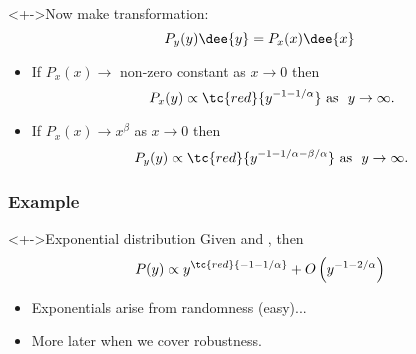\begin{frame}

  \begin{block}<+->{Now make transformation:}  
      $$
      P_y(y) \dee{y}
      = P_x(x) \dee{x}
      $$

      \bigskip

      \begin{itemize}
      \item<+->  
        If $P_x(x) \rightarrow$ non-zero constant
        as $x \rightarrow 0$ then
        $$
        P_x(y) 
        \propto 
        \tc{red}{y^{-1 -1/\alpha}} 
        \mbox{\ as \ } 
        y \rightarrow \infty. 
        $$
      \item<+->
        If $P_x(x) \rightarrow x^{\beta}$ as $x \rightarrow 0$ then
        $$ 
        P_y(y) 
        \propto 
        \tc{red}{y^{-1 -1/\alpha - \beta/\alpha}} 
        \mbox{\ as \ } 
        y \rightarrow \infty.
        $$
      \end{itemize}
  \end{block}

\end{frame}


\begin{frame}
  \frametitle{Example}

  \begin{block}<+->{Exponential distribution}
    Given  
    and , then
    $$ P(y) \propto y^{\tc{red}{-1-1/\alpha}} + O\left(y^{-1-2/\alpha}\right)$$
    \begin{itemize}
    \item<+->
      Exponentials arise from randomness (easy)...
    \item<+->
      More later when we cover robustness.
    \end{itemize}
  \end{block}


\end{frame}

